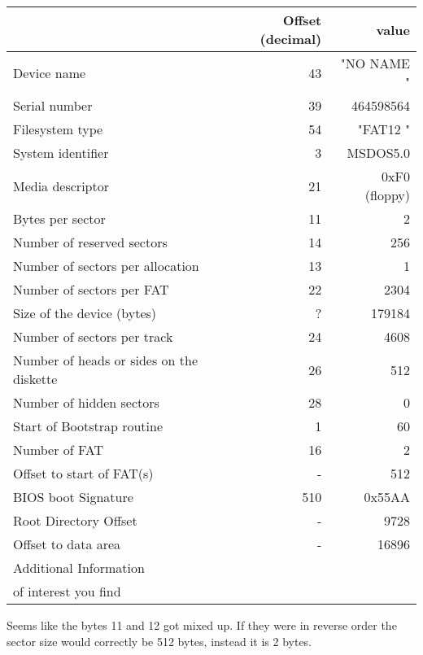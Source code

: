 \documentclass{article}
\begin{document}
\begin{tabular}{|l|r|r|}
    \hline
     & Offset (decimal) & value\\
    \hline
    Device name & 43 & "NO NAME    "\\
    \hline
    Serial number & 39 & 464598564\\
    \hline
    Filesystem type & 54 & "FAT12   "\\
    \hline
    System identifier & 3 & MSDOS5.0\\
    \hline
    Media descriptor & 21 & 0xF0 (floppy)\\
    \hline
    Bytes per sector & 11 & 2\\
    \hline
    Number of reserved sectors & 14 & 256\\
    \hline
    Number of sectors per allocation & 13 & 1\\
    \hline
    Number of sectors per FAT & 22 &2304\\
    \hline
    Size of the device (bytes) & ? & 179184\\
    \hline
    Number of sectors per track & 24 & 4608\\
    \hline
    Number of heads or sides on the diskette & 26 & 512\\
    \hline
    Number of hidden sectors & 28 & 0\\
    \hline
    Start of Bootstrap routine & 1 &60\\
    \hline
    Number of FAT & 16 & 2\\
    \hline
    Offset to start of FAT(s) & - & 512\\
    \hline
    BIOS boot Signature & 510 & 0x55AA\\
    \hline
    Root Directory Offset & - & 9728\\
    \hline
    Offset to data area & - & 16896\\
    \hline
    Additional Information & &\\
    of interest you find & &\\
    \hline
\end{tabular}

Seems like the bytes 11 and 12 got mixed up. If they were in reverse order the sector size would correctly be 512 bytes, instead it is 2 bytes.
\end{document}
